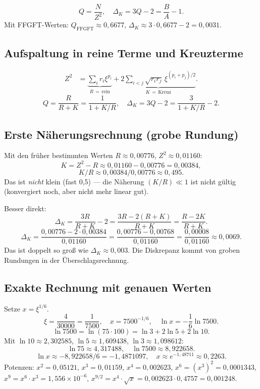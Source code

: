 \[
  Q = \frac{N}{Z^2}, \quad
  \Delta_K = 3Q-2 = \frac{B}{A}-1.
\]
Mit FFGFT-Werten: $Q_{\text{FFGFT}}\approx0{,}6677$,
$\Delta_K\approx3\cdot0{,}6677-2=0{,}0031$.

\subsection{Aufspaltung in reine Terme und Kreuzterme}

\begin{align*}
  Z^2 &= \underbrace{\sum_ir_i\xi^{p_i}}_{R\,=\,\text{rein}}
      + \underbrace{2\sum_{i<j}\sqrt{r_ir_j}\,\xi^{(p_i+p_j)/2}}_{K\,=\,\text{Kreuz}}.
\end{align*}
\[
  Q = \frac{R}{R+K} = \frac{1}{1+K/R}, \quad
  \Delta_K = 3Q-2 = \frac{3}{1+K/R}-2.
\]

\subsection{Erste Näherungsrechnung (grobe Rundung)}

Mit den früher bestimmten Werten $R\approx0{,}00776$, $Z^2\approx0{,}01160$:
\[
  K = Z^2-R\approx0{,}01160-0{,}00776=0{,}00384,
\]
\[
  K/R\approx0{,}00384/0{,}00776\approx0{,}495.
\]
Das ist \emph{nicht} klein (fast 0,5) — die Näherung $(K/R)\ll1$
ist nicht gültig (konvergiert noch, aber nicht mehr linear gut).

Besser direkt:
\[
  \Delta_K = \frac{3R}{R+K}-2 = \frac{3R-2(R+K)}{R+K} = \frac{R-2K}{R+K}.
\]
\[
  \Delta_K = \frac{0{,}00776-2\cdot0{,}00384}{0{,}01160}
  = \frac{0{,}00776-0{,}00768}{0{,}01160}
  = \frac{0{,}00008}{0{,}01160}\approx0{,}0069.
\]
Das ist doppelt so groß wie $\Delta_K\approx0{,}003$.
Die Diskrepanz kommt von groben Rundungen in der Überschlagsrechnung.

\subsection{Exakte Rechnung mit genauen Werten}

Setze $x=\xi^{1/6}$.
\[
  \xi=\frac{4}{30000}=\frac{1}{7500}, \quad
  x=7500^{-1/6}, \quad
  \ln x=-\frac{1}{6}\ln7500.
\]
\[
  \ln7500=\ln(75\cdot100)=\ln3+2\ln5+2\ln10.
\]
Mit $\ln10\approx2{,}302585$, $\ln5\approx1{,}609438$, $\ln3\approx1{,}098612$:
\[
  \ln75\approx4{,}317488, \quad
  \ln7500\approx8{,}922658.
\]
\[
  \ln x\approx-8{,}922658/6=-1{,}4871097, \quad
  x\approx e^{-1{,}48711}\approx0{,}2263.
\]
Potenzen:
$x^2=0{,}05121$, $x^3=0{,}01159$, $x^4=0{,}002623$,
$x^6=(x^3)^2=0{,}0001343$, $x^9=x^6\cdot x^3=1{,}556\times10^{-6}$,
$x^{9/2}=x^4\cdot\sqrt{x}=0{,}002623\cdot0{,}4757=0{,}001248$.

